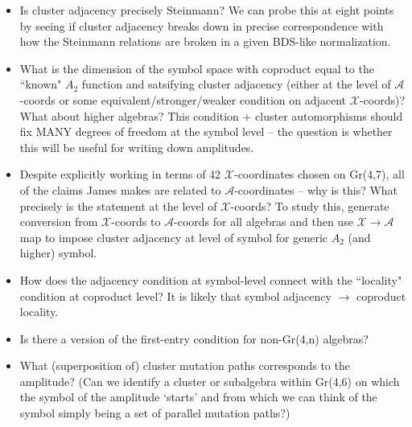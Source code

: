 \documentclass[12pt]{article}
\begin{document}
\begin{itemize}
	\item Is cluster adjacency precisely Steinmann? We can probe this at eight points by seeing if cluster adjacency breaks down in precise correspondence with how the Steinmann relations are broken in a given BDS-like normalization.

	\item What is the dimension of the symbol space with coproduct equal to the ``known" $A_2$ function and satsifying cluster adjacency (either at the level of $\mathcal{A}$-coords or some equivalent/stronger/weaker condition on adjacent $\mathcal{X}$-coords)? What about higher algebras? This condition + cluster automorphisms should fix MANY degrees of freedom at the symbol level -- the question is whether this will be useful for writing down amplitudes. 

	\item Despite explicitly working in terms of 42 $\mathcal{X}$-coordinates chosen on Gr(4,7), all of the claims James makes are related to $\mathcal{A}$-coordinates -- why is this? What precisely is the statement at the level of $\mathcal{X}$-coords? To study this, generate conversion from $\mathcal{X}$-coords to $\mathcal{A}$-coords for all algebras and then use $\mathcal{X}\to\mathcal{A}$ map to impose cluster adjacency at level of symbol for generic $A_2$ (and higher) symbol.

	\item How does the adjacency condition at symbol-level connect with the ``locality" condition at coproduct level? It is likely that symbol adjacency $\to$ coproduct locality. 
	
	\item Is there a version of the first-entry condition for non-Gr(4,n) algebras?

	\item What (superposition of) cluster mutation paths corresponds to the amplitude? (Can we identify a cluster or subalgebra within Gr(4,6) on which the symbol of the amplitude `starts' and from which we can think of the symbol simply being a set of parallel mutation paths?)
\end{itemize}
\end{document}
